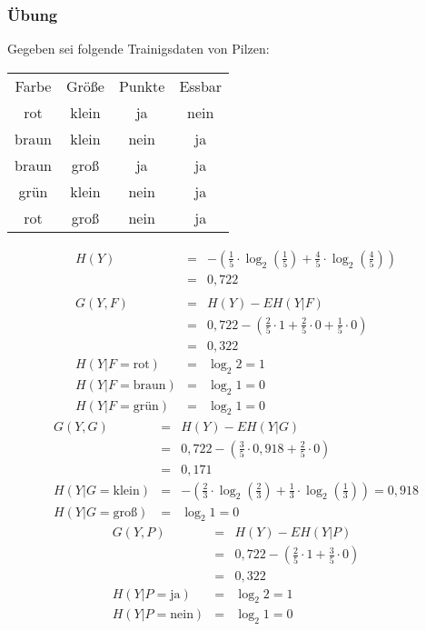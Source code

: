 \subsubsection{Übung}
Gegeben sei folgende Trainigsdaten von Pilzen:
\begin{table}[htbp]
	\centering
	\begin{tabular}{cccc}
		Farbe & Größe & Punkte & Essbar\\
		rot & klein & ja & nein\\
		braun & klein & nein & ja\\
		braun & groß & ja & ja\\
		grün & klein & nein & ja\\
		rot & groß & nein & ja
	\end{tabular}
\end{table}
\begin{eqnarray*}
	H(Y)	&=& -(\frac{1}{5} \cdot \log_2(\frac{1}{5}) + \frac{4}{5} \cdot \log_2(\frac{4}{5}))	\\
			&=& 0,722\\\\
	G(Y,F)	&=& H(Y) - E H(Y|F)\\
			&=& 0,722 - (\frac{2}{5} \cdot 1 + \frac{2}{5} \cdot 0 + \frac{1}{5} \cdot 0)			\\
			&=& 0,322\\
	H(Y|F=\textrm{rot})		&=& \log_2 2 = 1\\
	H(Y|F=\textrm{braun})	&=& \log_2 1 = 0\\
	H(Y|F=\textrm{grün})	&=& \log_2 1 = 0
\end{eqnarray*}
\begin{eqnarray*}
	G(Y,G)	&=& H(Y) - E H(Y|G)\\
			&=& 0,722 - (\frac{3}{5} \cdot 0,918 + \frac{2}{5} \cdot 0)			\\
			&=& 0,171\\
	H(Y|G=\textrm{klein})	&=& -(\frac{2}{3} \cdot \log_2(\frac{2}{3}) + \frac{1}{3}\cdot \log_2(\frac{1}{3})) = 0,918\\	
	H(Y|G=\textrm{groß})	&=& \log_2 1 = 0
\end{eqnarray*}
\begin{eqnarray*}
	G(Y,P)	&=& H(Y) - E H(Y|P)\\
			&=& 0,722 - (\frac{2}{5} \cdot 1 + \frac{3}{5} \cdot 0)			\\
			&=& 0,322\\
	H(Y|P=\textrm{ja})	&=& \log_2 2 = 1\\
	H(Y|P=\textrm{nein})	&=& \log_2 1 = 0
\end{eqnarray*}
